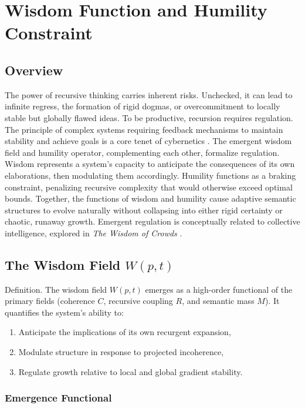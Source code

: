 \chapter{Wisdom Function and Humility Constraint}

\section{Overview}

The power of recursive thinking carries inherent risks. Unchecked, it can lead to infinite regress, the formation of rigid dogmas, or overcommitment to locally stable but globally flawed ideas. To be productive, recursion requires regulation. The principle of complex systems requiring feedback mechanisms to maintain stability and achieve goals is a core tenet of cybernetics \autocite{Wiener1948, Ashby1952}. The emergent wisdom field and humility operator, complementing each other, formalize regulation. Wisdom represents a system's capacity to anticipate the consequences of its own elaborations, then modulating them accordingly. Humility functions as a braking constraint, penalizing recursive complexity that would otherwise exceed optimal bounds. Together, the functions of wisdom and humility cause adaptive semantic structures to evolve naturally without collapsing into either rigid certainty or chaotic, runaway growth. Emergent regulation is conceptually related to collective intelligence, explored in \textit{The Wisdom of Crowds} \autocite{Surowiecki2004}.

\section{The Wisdom Field \(W(p, t)\)}

Definition.
The wisdom field \(W(p, t)\) emerges as a high-order functional of the primary fields (coherence \(C\), recursive coupling \(R\), and semantic mass \(M\)). It quantifies the system's ability to:

\begin{enumerate}
    \item Anticipate the implications of its own recurgent expansion,
    \item Modulate structure in response to projected incoherence,
    \item Regulate growth relative to local and global gradient stability.
\end{enumerate}

\subsection{Emergence Functional}

